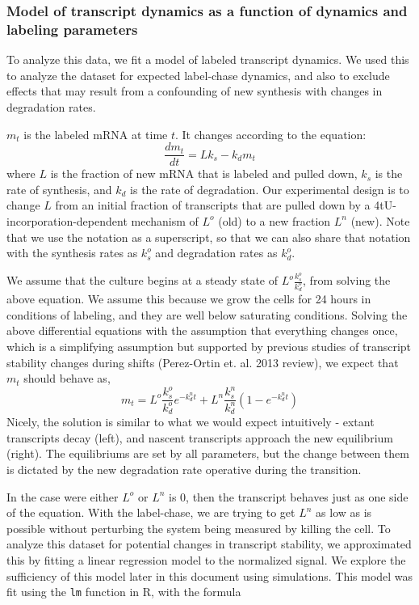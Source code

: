 {\subsubsection{Model of transcript dynamics as a function of 
dynamics and labeling parameters}

To analyze this data, we fit a model of 
labeled transcript dynamics.
We used this to analyze the dataset for expected label-chase
dynamics, and also to exclude effects that may result from a
confounding of new synthesis with changes in degradation rates.

\(m_t\) is the labeled mRNA at time \(t\). It changes according to the
equation: \[ \frac{d m_t}{dt} = L k_s - k_d m_t\] where \(L\) is the
fraction of new mRNA that is labeled and pulled down, \(k_s\) is the
rate of synthesis, and \(k_d\) is the rate of degradation. Our
experimental design is to change \(L\) from an initial fraction of
transcripts that are pulled down by a 4tU-incorporation-dependent
mechanism of \(L^o\) (old) to a new fraction \(L^n\) (new). Note that we
use the notation as a superscript, so that we can also share that
notation with the synthesis rates as \(k_s^o\) and degradation rates as
\(k_d^o\).

We assume that the culture begins at a steady state of
\(L^{o}\frac{k_s^{o}}{k_d^{o}}\), from solving the above equation.
We assume this because we grow the cells for 24 hours in conditions
of labeling, and they are well below saturating conditions.
Solving the above differential equations with the assumption that
everything changes once, which is a simplifying assumption but supported
by previous studies of transcript stability changes during shifts
(Perez-Ortin et. al. 2013 review), we expect that \(m_t\) should behave
as, \[ m_t = L^o \frac{k_s^o}{k_d^o} e^{-k_d^n t} + 
  L^n\frac{k_s^n}{k_d^n}(1-e^{-k_d^n t}) \] Nicely, the solution is
similar to what we would expect intuitively - extant transcripts decay
(left), and nascent transcripts approach the new equilibrium (right).
The equilibriums are set by all parameters, but the change between them
is dictated by the new degradation rate operative during the transition.

In the case were either \(L^o\) or \(L^n\) is 0, then the transcript
behaves just as one side of the equation. With the label-chase, we are
trying to get \(L^n\) as low as is possible without perturbing the
system being measured by killing the cell.
To analyze this dataset for potential changes in transcript stability,
we approximated this by fitting a linear regression model to the
normalized signal. We explore the sufficiency of this model later in
this document using simulations. This model was fit using the
\texttt{lm} function in R, with the formula

}
